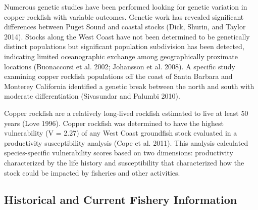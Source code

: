 \documentclass[11pt,
  english,
  a4paper,
]{article}
\begin{document}
\leavevmode\tagmcend\tagstructend\par


Numerous genetic studies have been performed looking for genetic variation in copper rockfish with variable outcomes. Genetic work has revealed significant differences between Puget Sound and coastal stocks {(Dick, Shurin, and Taylor 2014)\leavevmode\tagmcend\tagstructend}. Stocks along the West Coast have not been determined to be genetically distinct populations but significant population subdivision has been detected, indicating limited oceanographic exchange among geographically proximate locations {(Buonaccorsi et al. 2002; Johansson et al. 2008)\leavevmode\tagmcend\tagstructend}. A specific study examining copper rockfish populations off the coast of Santa Barbara and Monterey California identified a genetic break between the north and south with moderate differentiation {(Sivasundar and Palumbi 2010)\leavevmode\tagmcend\tagstructend}.

\leavevmode\tagmcend\tagstructend\par


Copper rockfish are a relatively long-lived rockfish estimated to live at least 50 years {(Love 1996)\leavevmode\tagmcend\tagstructend}. Copper rockfish was determined to have the highest vulnerability (V = 2.27) of any West Coast groundfish stock evaluated in a productivity susceptibility analysis {(Cope et al. 2011)\leavevmode\tagmcend\tagstructend}. This analysis calculated species-specific vulnerability scores based on two dimensions: productivity characterized by the life history and susceptibility that characterized how the stock could be impacted by fisheries and other activities.

\leavevmode\tagmcend\tagstructend\par


\hypertarget{historical-and-current-fishery-information}{%
\subsection{Historical and Current Fishery Information}\label{historical-and-current-fishery-information}}
\end{document}

